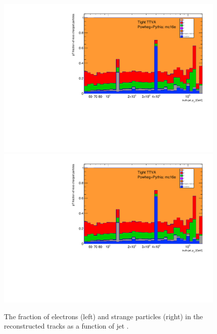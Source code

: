 \begin{figure}
\centering
\includegraphics[scale=0.3, page=8]{figures/jet_comp_study_powheg_Tight_pTFraction_mc16e.pdf}
\includegraphics[scale=0.3, page=9]{figures/jet_comp_study_powheg_Tight_pTFraction_mc16e.pdf}
\caption {The fraction of electrons (left) and strange particles (right) in the reconstructed tracks as a function of jet \pT.}
\label{fig:response electrons and starnge particles}
\end{figure}

\clearpage
